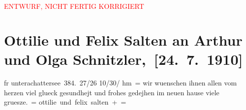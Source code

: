 
\begin{center}
            \textcolor{red}{ENTWURF, NICHT FERTIG KORRIGIERT}
                      \end{center}
            
         
         \renewcommand{\erwaehntePersonen}{Personen: Olga Schnitzler}
         \renewcommand{\erwaehnteOrte}{Orte: Sternwartestraße 71, Unterach am Attersee, Wien}
         \renewcommand{\erwaehnteWerke}{}
               \section[ Ottilie und Felix Salten an Arthur und Olga Schnitzler, {[}24. 7. 1910{]}]{ Ottilie und Felix Salten an Arthur und Olga
               Schnitzler, {[}24. 7. 1910{]}}\nopagebreak{}\rehead{ }\begin{ledgroupsized}[t]{13cm}\normalsize\beginnumbering \toendnotes[C]{\smallbreak\pagebreak[2]} 
\toendnotes[C]{\smallbreak}\pstart
           \noindent{}\centering{}{\pb}fr unterachattersee 384. 27/26 10/30/ hm =\pend
           \pstart
           wir wuenschen ihnen allen vom herzen viel glueck gesundhejt und frohes gedejhen im
               neuen hause viele
               gruesze. =\pend
           \pstart
           \spacefill\mbox{ottilie und felix salten + =}\pend
           
         
         \endnumbering{}\end{ledgroupsized}  \newcommand{\dateiname}{L03550}\newcommand{\titel}{Ottilie und Felix Salten an Arthur und Olga Schnitzler, [24. 7. 1910]}\newcommand{\editorInnen}{Martin Anton Müller und Laura Untner}
      